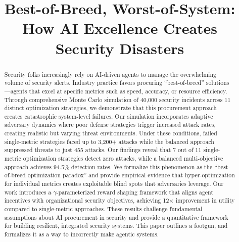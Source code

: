 \documentclass[10pt,conference]{IEEEtran}
\begin{document}
\title{Best-of-Breed, Worst-of-System: How AI Excellence Creates Security Disasters}

\author{
\and
{}
}

\maketitle

\begin{abstract}
Security folks increasingly rely on AI-driven agents to manage the overwhelming volume of security alerts. Industry practice favors procuring ``best-of-breed'' solutions---agents that excel at specific metrics such as speed, accuracy, or resource efficiency. Through comprehensive Monte Carlo simulation of 40,000 security incidents across 11 distinct optimization strategies, we demonstrate that this procurement approach creates catastrophic system-level failures. Our simulation incorporates adaptive adversary dynamics where poor defense strategies trigger increased attack rates, creating realistic but varying threat environments. Under these conditions, failed single-metric strategies faced up to 3,200+ attacks while the balanced approach suppressed threats to just 455 attacks. Our findings reveal that 7 out of 11 single-metric optimization strategies detect zero attacks, while a balanced multi-objective approach achieves 94.5\% detection rates. We formalize this phenomenon as the ``best-of-breed optimization paradox'' and provide empirical evidence that hyper-optimization for individual metrics creates exploitable blind spots that adversaries leverage. Our work introduces a $\gamma$-parameterized reward shaping framework that aligns agent incentives with organizational security objectives, achieving 12$\times$ improvement in utility compared to single-metric approaches. These results challenge fundamental assumptions about AI procurement in security and provide a quantitative framework for building resilient, integrated security systems.
This paper outlines a footgun, and formalizes it as a way to incorrectly make agentic systems.
\end{abstract}
\end{document}
